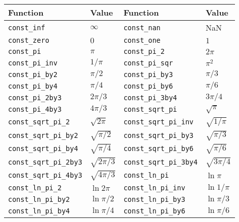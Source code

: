 \begin{table}
  \begin{tabularx}{\textwidth}{p{1.25in}Lp{1.25in}L}
    \toprule
    Function & Value & Function & Value \\
    \midrule
    \texttt{const\_inf}            & $\infty$        &
    \texttt{const\_nan}            & NaN             \\
    \texttt{const\_zero}           & $0$             &
    \texttt{const\_one}            & $1$             \\
    \texttt{const\_pi}             & $\pi$           &
    \texttt{const\_pi\_2}          & $2\pi$          \\
    \texttt{const\_pi\_inv}        & $1/\pi$         &
    \texttt{const\_pi\_sqr}        & $\pi^2$         \\
    \texttt{const\_pi\_by2}        & $\pi/2$         &
    \texttt{const\_pi\_by3}        & $\pi/3$         \\
    \texttt{const\_pi\_by4}        & $\pi/4$         &
    \texttt{const\_pi\_by6}        & $\pi/6$         \\
    \texttt{const\_pi\_2by3}       & $2\pi/3$        &
    \texttt{const\_pi\_3by4}       & $3\pi/4$        \\
    \texttt{const\_pi\_4by3}       & $4\pi/3$        &
    \texttt{const\_sqrt\_pi}       & $\sqrt{\pi}$    \\
    \texttt{const\_sqrt\_pi\_2}    & $\sqrt{2\pi}$   &
    \texttt{const\_sqrt\_pi\_inv}  & $\sqrt{1/\pi}$  \\
    \texttt{const\_sqrt\_pi\_by2}  & $\sqrt{\pi/2}$  &
    \texttt{const\_sqrt\_pi\_by3}  & $\sqrt{\pi/3}$  \\
    \texttt{const\_sqrt\_pi\_by4}  & $\sqrt{\pi/4}$  &
    \texttt{const\_sqrt\_pi\_by6}  & $\sqrt{\pi/6}$  \\
    \texttt{const\_sqrt\_pi\_2by3} & $\sqrt{2\pi/3}$ &
    \texttt{const\_sqrt\_pi\_3by4} & $\sqrt{3\pi/4}$ \\
    \texttt{const\_sqrt\_pi\_4by3} & $\sqrt{4\pi/3}$ &
    \texttt{const\_ln\_pi}         & $\ln{\pi}$      \\
    \texttt{const\_ln\_pi\_2}      & $\ln{2\pi}$     &
    \texttt{const\_ln\_pi\_inv}    & $\ln{1/\pi}$    \\
    \texttt{const\_ln\_pi\_by2}    & $\ln{\pi/2}$    &
    \texttt{const\_ln\_pi\_by3}    & $\ln{\pi/3}$    \\
    \texttt{const\_ln\_pi\_by4}    & $\ln{\pi/4}$    &
    \texttt{const\_ln\_pi\_by6}    & $\ln{\pi/6}$    \\

\end{tabularx}
\end{table}
